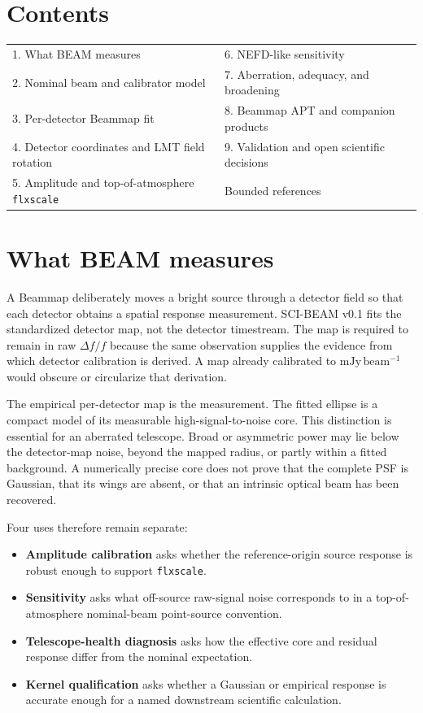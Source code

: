 \documentclass[11pt]{article}
\begin{document}
\section*{Contents}
\begin{tabularx}{\linewidth}{@{}YY@{}}
1. What BEAM measures & 6. NEFD-like sensitivity \\
2. Nominal beam and calibrator model & 7. Aberration, adequacy, and broadening \\
3. Per-detector Beammap fit & 8. Beammap APT and companion products \\
4. Detector coordinates and LMT field rotation & 9. Validation and open scientific decisions \\
5. Amplitude and top-of-atmosphere \texttt{flxscale} & Bounded references \\
\end{tabularx}
\clearpage

\section{What BEAM measures}
\label{sec:what}

A Beammap deliberately moves a bright source through a detector field so that
each detector obtains a spatial response measurement. SCI-BEAM v0.1 fits the
standardized detector map, not the detector timestream. The map is required to
remain in raw $\Delta f/f$ because the same observation supplies the evidence
from which detector calibration is derived. A map already calibrated to
$\mathrm{mJy\,beam^{-1}}$ would obscure or circularize that derivation.

The empirical per-detector map is the measurement. The fitted ellipse is a
compact model of its measurable high-signal-to-noise core. This distinction is
essential for an aberrated telescope. Broad or asymmetric power may lie below
the detector-map noise, beyond the mapped radius, or partly within a fitted
background. A numerically precise core does not prove that the complete PSF is
Gaussian, that its wings are absent, or that an intrinsic optical beam has
been recovered.

Four uses therefore remain separate:

\begin{itemize}
\item \textbf{Amplitude calibration} asks whether the reference-origin source
response is robust enough to support \texttt{flxscale}.
\item \textbf{Sensitivity} asks what off-source raw-signal noise corresponds
to in a top-of-atmosphere nominal-beam point-source convention.
\item \textbf{Telescope-health diagnosis} asks how the effective core and
residual response differ from the nominal expectation.
\item \textbf{Kernel qualification} asks whether a Gaussian or empirical
response is accurate enough for a named downstream scientific calculation.
\end{itemize}
\end{document}
